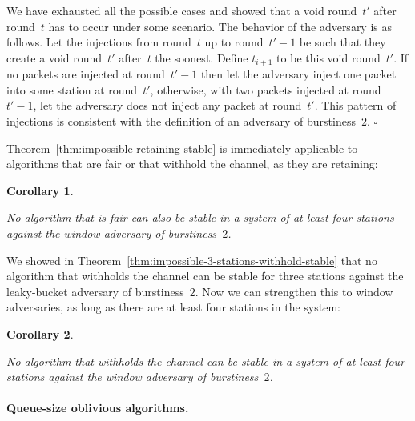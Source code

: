 \documentclass[11pt]{article}
\newcommand{\BBB}{\vspace*{-\bigskipamount}}
\newcommand{\Paragraph}[1]{\BBB\paragraph{#1}}
\newcommand{\qed}{\hfill $\square$ \smallbreak}
\newenvironment{proof}{\noindent{\bf Proof:}}{\qed}
\newtheorem{corollary}{Corollary}
\begin{document}
\begin{proof}
We have exhausted all the possible cases and showed that a void round~$t'$ after round~$t$ has to occur under some scenario.
The behavior of the adversary is as follows.
Let the injections from round~$t$ up to round~$t'-1$ be such that they create a void round~$t'$ after~$t$ the soonest.
Define $t_{i+1}$ to be this void round~$t'$.
If no packets are injected at round~$t'-1$ then let the adversary inject one packet into some station at round~$t'$, otherwise, with two packets injected at round~$t'-1$, let the adversary does not inject any packet at round~$t'$.
This pattern of injections is consistent with the definition of an adversary of burstiness~$2$.
\end{proof}

Theorem~\ref{thm:impossible-retaining-stable} is immediately applicable to algorithms that are fair or that withhold the channel, as they are retaining:


\begin{corollary}
\label{cor:impossible-fair-stable-4-stations-window}

No algorithm that is fair can also be stable in a system of at least four stations against the window adversary of burstiness~$2$.
\end{corollary}

We showed in Theorem~\ref{thm:impossible-3-stations-withhold-stable} that no algorithm that withholds the channel can be stable for three stations against the leaky-bucket  adversary of burstiness~$2$.
Now we can strengthen this to window adversaries, as long as there are at least four stations in the system:


\begin{corollary}
\label{cor:impossible-withholds-channel-4-stations-window}

No algorithm that withholds the channel can be stable in a system of at least four stations against the window adversary of burstiness~$2$.
\end{corollary}





\Paragraph{Queue-size oblivious algorithms.}
\end{document}
